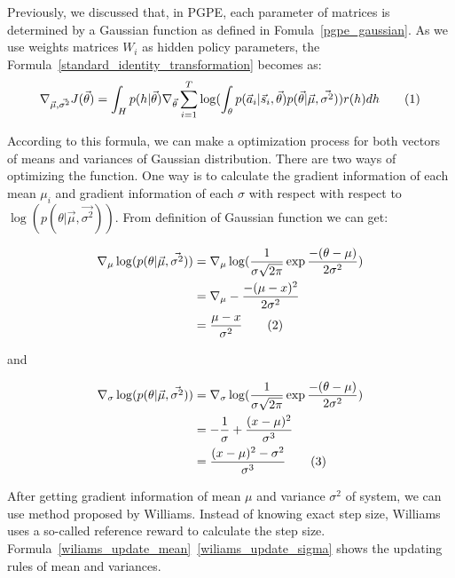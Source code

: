 \documentclass[officiallayout]{tktla}
\newcommand\numberthis{\addtocounter{equation}{1}\tag{\theequation}}
\begin{document}
Previously, we discussed that, in PGPE, each parameter of matrices is determined by a Gaussian function as defined in Fomula~\ref{pgpe_gaussian}. As we use weights matrices $W_i$ as hidden policy parameters, the Formula~\ref{standard_identity_transformation} becomes as:
\begin{align*}
\nabla_{\vec{\mu}, \vec{\sigma^2}} J(\vec{\theta}) = \int_H p(h|\vec{\theta}) \nabla_{\vec{\theta}} \sum_{i=1}^T\log(\int_\theta p(\vec{a}_{i}|\vec{s}_{i}, \vec{\theta})p(\vec{\theta}|\vec{\mu},\vec{\sigma^2}))r(h)dh \numberthis \label{standard_identity_transformation_replaced_by_mean_sigma}
\end{align*}

According to this formula, we can make a optimization process for both vectors of means and variances of Gaussian distribution. There are two ways of optimizing the function. One way is to calculate the gradient information of each mean $\mu_i$ and gradient information of each $\sigma$ with respect with respect to $\log(p(\theta| \vec{\mu}, \vec{\sigma^2}))$. From definition of Gaussian function we can get:

\begin{align*}
\nabla_\mu \log(p(\theta| \vec{\mu}, \vec{\sigma^2})) &= \nabla_\mu \log(\frac{1}{\sigma\sqrt{2\pi}}\exp\frac{-(\theta - \mu)}{2\sigma^2}) \\
&= \nabla_\mu -\frac{-(\mu - x)^2}{2\sigma^2} \\
&= \frac{\mu-x}{\sigma^2}   \numberthis \label{gaussian_mean_gradient} 
\end{align*}

and 

\begin{align*}
\nabla_\sigma \log(p(\theta| \vec{\mu}, \vec{\sigma^2})) &= \nabla_\sigma \log(\frac{1}{\sigma\sqrt{2\pi}}\exp\frac{-(\theta - \mu)}{2\sigma^2}) \\
&= -\frac{1}{\sigma} + \frac{(x-\mu)^2}{\sigma^3} \\
&= \frac{(x-\mu)^2 - \sigma^2}{\sigma^3}   \numberthis \label{gaussian_sigma_gradient}
\end{align*}

After getting gradient information of mean $\mu$ and variance $\sigma^2$ of system, we can use method proposed by Williams\cite{williams1992simple}. Instead of knowing exact step size, Williams uses a so-called reference reward to calculate the step size. Formula~\ref{wiliams_update_mean}~\ref{wiliams_update_sigma} shows the updating rules of mean and variances.
\end{document}
